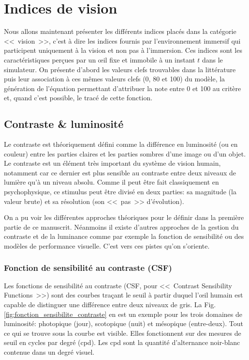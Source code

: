 \chapter{Indices de vision}
	\par Nous allons maintenant présenter les différents indices placés dans la catégorie <<~vision~>>, c'est à dire les indices fournis par l'environnement immersif qui participent uniquement à la vision et non pas à l'immersion. Ces indices sont les caractéristiques perçues par un œil fixe et immobile à un instant $t$ dans le simulateur. On présente d'abord les valeurs clefs trouvables dans la littérature puis leur association à ces mêmes valeurs clefs (0, 80 et 100) du modèle, la génération de l'équation permettant d'attribuer la note entre 0 et 100 au critère et, quand c'est possible, le tracé de cette fonction.
	
	\section{Contraste \& luminosité}
	\par Le contraste est théoriquement défini comme la différence en luminosité (ou en couleur) entre les parties claires et les parties sombres d'une image ou d'un objet. Le contraste est un élément très important du système de vision humain, notamment car ce dernier est plus sensible au contraste entre deux niveaux de lumière qu'à un niveau absolu. Comme il peut être fait classiquement en psychophysique, ce stimulus peut être divisé en deux parties: sa magnitude (la valeur brute) et sa résolution (son <<~pas~>> d'évolution).
	
	\par On a pu voir les différentes approches théoriques pour le définir dans la première partie de ce manuscrit. Néanmoins il existe d'autres approches de la gestion du contraste et de la luminance comme par exemple la fonction de sensibilité ou des modèles de performance visuelle. C'est vers ces pistes qu'on s'oriente.
	
	\subsection{Fonction de sensibilité au contraste (CSF)}
	\par Les fonctions de sensibilité au contraste (CSF, pour <<~Contrast Sensibility Functions~>>) sont des courbes traçant le seuil à partir duquel l'œil humain est capable de distinguer une différence entre deux niveaux de gris. La Fig. \ref{fig:fonction_sensibilite_contraste} en est un exemple pour les trois domaines de luminosité: photopique (jour), scotopique (nuit) et mésopique (entre-deux). Tout ce qui se trouve sous la courbe est visible. Elles fonctionnent sur des mesures de seuil en cycles par degré (cpd). Les cpd sont la quantité d'alternance noir-blanc contenue dans un degré visuel.
	
